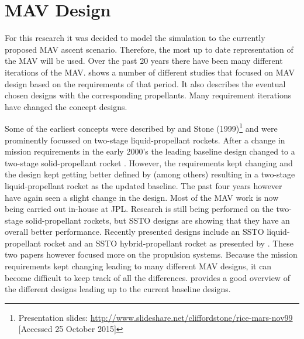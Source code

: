 \section{\ac{MAV} Design}
\label{sec:mavDesign}
For this research it was decided to model the simulation to the currently proposed \ac{MAV} ascent scenario. Therefore, the most up to date representation of the \ac{MAV} will be used. Over the past 20 years there have been many different iterations of the \ac{MAV}.  shows a number of different studies that focused on \ac{MAV} design based on the requirements of that period. It also describes the eventual chosen designs with the corresponding propellants. Many requirement iterations have changed the concept designs.

Some of the earliest concepts were described by \cite{whitehead1997,guernsey1998,desai1998} and Stone (1999)\footnote{\label{stone} Presentation slides: \url{http://www.slideshare.net/cliffordstone/rice-mars-nov99} [Accessed 25 October 2015]} and were prominently focussed on two-stage liquid-propellant rockets. After a change in mission requirements in the early 2000's the leading baseline design changed to a two-stage solid-propellant rocket \citep{stephenson2002,whitehead2005,stephenson2006}. However, the requirements kept changing and the design kept getting better defined by (among others) \cite{sengupta2012,trinidad2012,mungas2012,mppg2012} resulting in a two-stage liquid-propellant rocket as the updated baseline. The past four years however have again seen a slight change in the design. Most of the \ac{MAV} work is now being carried out in-house at \ac{JPL}. Research is still being performed on the two-stage solid-propellant rockets, but \ac{SSTO} designs are showing that they have an overall better performance. Recently presented designs include an \ac{SSTO} liquid-propellant rocket \citep{vaughan2016technology} and an \ac{SSTO} hybrid-propellant rocket as presented by \cite{karp2016technology}. These two papers however focused more on the propulsion systems. Because the mission requirements kept changing leading to many different \ac{MAV} designs, it can become difficult to keep track of all the differences. \cite{shotwell2016history} provides a good overview of the different designs leading up to the current baseline designs. \\

